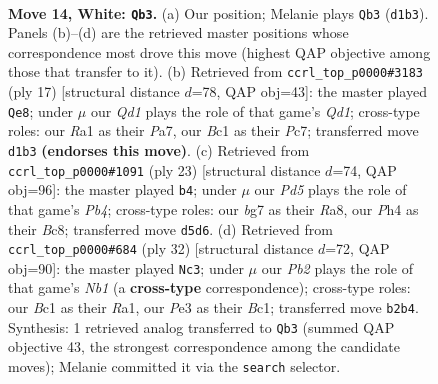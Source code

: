 \documentclass[11pt]{article}
\begin{document}
\begin{figure}[p]
\label{fig:thought-m24}
\end{figure}

\clearpage

\begin{figure}[p]\centering
\begin{subfigure}{0.46\textwidth}\centering
\resizebox{\linewidth}{!}{%
\newchessgame
\chessboard[
  setfen={r1bq1rk1/pp2n1bp/6p1/2pPpp1n/7P/4PNP1/PP1P1P2/RNBQRK1B w - - 1 14},
  showmover=false,
  pgfstyle=straightmove, color=movearrow, markmove={d1-b3}
]}
\caption{}
\end{subfigure}\hfill
\begin{subfigure}{0.46\textwidth}\centering
\resizebox{\linewidth}{!}{%
\newchessgame
\chessboard[
  setfen={r1bq1rk1/ppp1p1bp/3p1np1/3Pnp2/5N2/2P3P1/PP1NPPBP/R1BQ1RK1 b - - 4 9},
  showmover=false,
  pgfstyle=straightmove, color=movearrow, markmove={d8-e8}
]}
\caption{}
\end{subfigure}
\\[4pt]
\begin{subfigure}{0.46\textwidth}\centering
\resizebox{\linewidth}{!}{%
\newchessgame
\chessboard[
  setfen={r1b2rk1/4ppbp/1qnp1np1/pp6/4PP2/PNNQ4/1PP1B1PP/R1B2R1K b - - 1 12},
  showmover=false,
  pgfstyle=straightmove, color=movearrow, markmove={b5-b4}
]}
\caption{}
\end{subfigure}\hfill
\begin{subfigure}{0.46\textwidth}\centering
\resizebox{\linewidth}{!}{%
\newchessgame
\chessboard[
  setfen={r1bqrbk1/4npp1/p2p1n1p/1p1Pp3/4P3/PP3N1P/B4PP1/RNBQR1K1 w - - 1 17},
  showmover=false,
  pgfstyle=straightmove, color=movearrow, markmove={b1-c3}
]}
\caption{}
\end{subfigure}
\caption{\textbf{Move 14, White: \texttt{Qb3}.} (a) Our position; Melanie plays \texttt{Qb3} (\texttt{d1b3}). Panels (b)--(d) are the retrieved master positions whose correspondence most drove this move (highest QAP objective among those that transfer to it). (b) Retrieved from \texttt{ccrl\_top\_p0000\#3183} (ply 17) [structural distance $d$=78, QAP obj=43]: the master played \texttt{Qe8}; under $\mu$ our \emph{Qd1} plays the role of that game's \emph{Qd1}; cross-type roles: our \emph{R}a1 as their \emph{P}a7, our \emph{B}c1 as their \emph{P}c7; transferred move \texttt{d1b3} \textbf{(endorses this move)}. (c) Retrieved from \texttt{ccrl\_top\_p0000\#1091} (ply 23) [structural distance $d$=74, QAP obj=96]: the master played \texttt{b4}; under $\mu$ our \emph{Pd5} plays the role of that game's \emph{Pb4}; cross-type roles: our \emph{b}g7 as their \emph{R}a8, our \emph{P}h4 as their \emph{B}c8; transferred move \texttt{d5d6}. (d) Retrieved from \texttt{ccrl\_top\_p0000\#684} (ply 32) [structural distance $d$=72, QAP obj=90]: the master played \texttt{Nc3}; under $\mu$ our \emph{Pb2} plays the role of that game's \emph{Nb1} (a \textbf{cross-type} correspondence); cross-type roles: our \emph{B}c1 as their \emph{R}a1, our \emph{P}e3 as their \emph{B}c1; transferred move \texttt{b2b4}. Synthesis: 1 retrieved analog transferred to \texttt{Qb3} (summed QAP objective 43, the strongest correspondence among the candidate moves); Melanie committed it via the \texttt{search} selector.}
\label{fig:thought-m26}
\end{figure}
\end{document}

